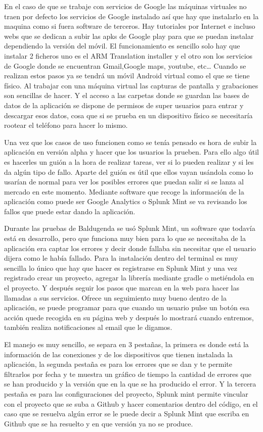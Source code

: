En el caso de que se trabaje con servicios de Google las máquinas virtuales no traen por defecto los servicios de Google instalado así que hay que instalarlo en la maquina como si fuera software de terceros. Hay tutoriales por Internet e incluso webs que se dedican a subir las apks de Google play para que se puedan instalar dependiendo la versión del móvil.
El funcionamiento es sencillo solo hay que instalar 2 ficheros uno es el ARM Translation installer y el otro son los servicios de Google donde se encuentran Gmail,Google maps, youtube, etc…
Cuando se realizan estos pasos ya se tendrá un móvil Android virtual como el que se tiene físico.
Al trabajar con una máquina virtual las capturas de pantalla y grabaciones son sencillas de hacer. Y el acceso a las carpetas donde se guardan las bases de datos de la aplicación se dispone de permisos de super usuarios para entrar y descargar esos datos, cosa que si se prueba en un dispositivo físico se necesitaría rootear el teléfono para hacer lo mismo.

Una vez que los casos de uso funcionen como se tenía pensado es hora de subir la aplicación en versión alpha y hacer que los usuarios la prueben.
Para ello algo útil es hacerles un guión a la hora de realizar tareas, ver si lo pueden realizar y si les da algún tipo de fallo.
Aparte del guión es útil que ellos vayan usándola como lo usarían de normal para ver los posibles errores que puedan salir si se lanza al mercado en este momento.
Mediante software que recoge la información de la aplicación como puede ser Google Analytics o Splunk Mint se va revisando los fallos que puede estar dando la aplicación.

Durante las pruebas de Baldugenda se usó Splunk Mint, un software que todavía está en desarrollo, pero que funciona muy bien para lo que se necesitaba de la aplicación era captar los errores y decir donde fallaba sin necesitar que el usuario dijera como le había fallado.
Para la instalación dentro del terminal es muy sencilla lo único que hay que hacer es registrarse en Splunk Mint y una vez registrado crear un proyecto, agregar la librería mediante gradle o metiéndola en el proyecto.
Y después seguir los pasos que marcan en la web para hacer las llamadas a sus servicios.
Ofrece un seguimiento muy bueno dentro de la aplicación, se puede programar para que cuando un usuario pulse un botón esa acción quede recogida en su página web y después lo mostrará cuando entremos, también realiza notificaciones al email que le digamos.

El manejo es muy sencillo, se separa en 3 pestañas, la primera es donde está la información de las conexiones y de los dispositivos que tienen instalada la aplicación, la segunda pestaña es para los errores que se dan y te permite filtrarlos por fecha y te muestra un gráfico de tiempo la cantidad de errores que se han producido y la versión que en la que se ha producido el error. Y la tercera pestaña es para las configuraciones del proyecto, Splunk mint permite vincular con el proyecto que se suba a Github y hacer comentarios dentro del código, en el caso que se resuelva algún error se le puede decir a Splunk Mint que escriba en Github que se ha resuelto y en que versión ya no se produce.

